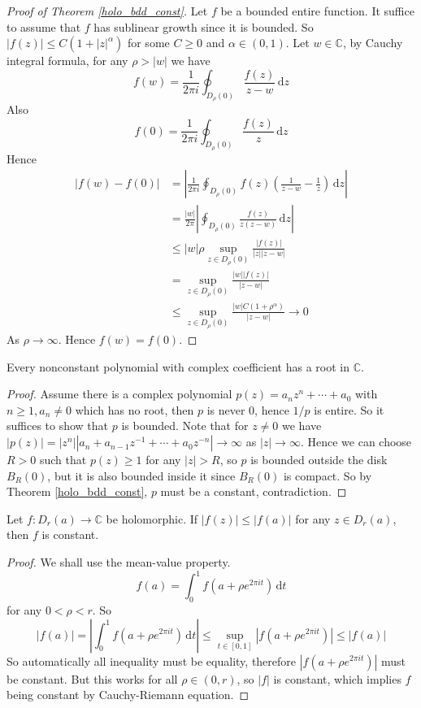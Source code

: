 \begin{proof}[Proof of Theorem \ref{holo_bdd_const}]
    Let $f$ be a bounded entire function.
    It suffice to assume that $f$ has sublinear growth since it is bounded.
    So $|f(z)|\le C(1+|z|^\alpha)$ for some $C\ge 0$ and $\alpha\in (0,1)$.
    Let $w\in\mathbb C$, by Cauchy integral formula, for any $\rho>|w|$ we have
    $$f(w)=\frac{1}{2\pi i}\oint_{D_\rho(0)}\frac{f(z)}{z-w}\,\mathrm dz$$
    Also
    $$f(0)=\frac{1}{2\pi i}\oint_{D_\rho(0)}\frac{f(z)}{z}\,\mathrm dz$$
    Hence
    \begin{align*}
        |f(w)-f(0)|&=\left|\frac{1}{2\pi i}\oint_{D_\rho(0)}f(z)\left(\frac{1}{z-w}-\frac{1}{z}\right)\,\mathrm dz\right|\\
        &=\frac{|w|}{2\pi}\left|\oint_{D_\rho(0)}\frac{f(z)}{z(z-w)}\,\mathrm dz\right|\\
        &\le|w|\rho\sup_{z\in D_\rho(0)}\frac{|f(z)|}{|z||z-w|}\\
        &=\sup_{z\in D_\rho(0)}\frac{|w||f(z)|}{|z-w|}\\
        &\le\sup_{z\in D_\rho(0)}\frac{|w|C(1+\rho^\alpha)}{|z-w|}\to 0
    \end{align*}
    As $\rho\to\infty$.
    Hence $f(w)=f(0)$.
\end{proof}
\begin{corollary}
    Every nonconstant polynomial with complex coefficient has a root in $\mathbb C$.
\end{corollary}
\begin{proof}
    Assume there is a complex polynomial $p(z)=a_nz^n+\cdots+a_0$ with $n\ge1,a_n\neq 0$ which has no root, then $p$ is never $0$, hence $1/p$ is entire.
    So it suffices to show that $p$ is bounded.
    Note that for $z\neq 0$ we have $|p(z)|=|z^n||a_n+a_{n-1}z^{-1}+\cdots+a_0z^{-n}|\to\infty$ as $|z|\to\infty$.
    Hence we can choose $R>0$ such that $p(z)\ge 1$ for any $|z|>R$, so $p$ is bounded outside the disk $B_R(0)$, but it is also bounded inside it since $B_R(0)$ is compact.
    So by Theorem \ref{holo_bdd_const}, $p$ must be a constant, contradiction.
\end{proof}
\begin{theorem}
    Let $f:D_r(a)\to\mathbb C$ be holomorphic.
    If $|f(z)|\le|f(a)|$ for any $z\in D_r(a)$, then $f$ is constant.
\end{theorem}
\begin{proof}
    We shall use the mean-value property.
    $$f(a)=\int_0^1 f(a+\rho e^{2\pi it})\,\mathrm dt$$
    for any $0<\rho<r$.
    So
    $$|f(a)|=\left|\int_0^1 f(a+\rho e^{2\pi it})\,\mathrm dt\right|\le\sup_{t\in [0,1]}|f(a+\rho e^{2\pi it})|\le|f(a)|$$
    So automatically all inequality must be equality, therefore $|f(a+\rho e^{2\pi it})|$ must be constant.
    But this works for all $\rho\in (0,r)$, so $|f|$ is constant, which implies $f$ being constant by Cauchy-Riemann equation.
\end{proof}
